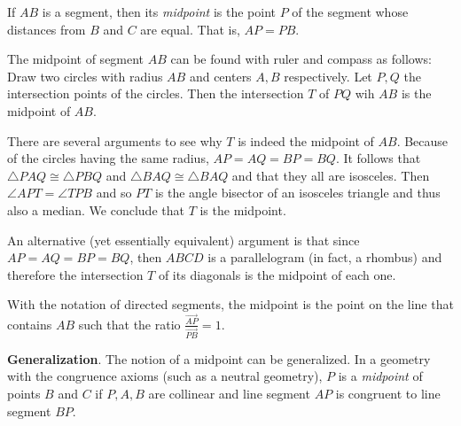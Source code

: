 \documentclass{article}
\begin{document}
If $AB$ is a segment, then its \emph{midpoint} is the point $P$ of the segment whose distances from $B$ and $C$ are equal. That is, $AP = PB$.

The midpoint of segment $AB$ can be found with ruler and compass as follows: Draw two circles with radius $AB$ and centers $A,B$ respectively. Let $P,Q$ the intersection points of the circles. Then the intersection $T$ of $PQ$ wih $AB$ is the midpoint of $AB$.

\begin{center}
\end{center}

There are several arguments to see why $T$ is indeed the midpoint of $AB$. Because of the circles having the same radius, $AP=AQ=BP=BQ$. It follows that $\triangle PAQ\cong\triangle PBQ$ and $\triangle  BAQ\cong \triangle BAQ$ and that they all are isosceles. Then $\angle APT =\angle TPB$ and so $PT$ is the angle bisector of an isosceles triangle and thus also a median. We conclude that $T$ is the midpoint. 

An alternative (yet essentially equivalent) argument is  that since $AP=AQ=BP=BQ$, then $ABCD$ is a parallelogram (in fact, a rhombus) and therefore
the intersection $T$ of its diagonals is the midpoint of each one.

With the notation of directed segments, the midpoint is the point on the line that contains $AB$ such that the ratio $\frac{\overrightarrow{AP}}{\overrightarrow{PB}}=1$.

\textbf{Generalization}.  The notion of a midpoint can be generalized.  In a geometry with the congruence axioms (such as a neutral geometry), $P$ is a \emph{midpoint} of points $B$ and $C$ if $P,A,B$ are collinear and line segment $AP$ is congruent to line segment $BP$. 
\end{document}
